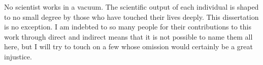 
No scientist works in a vacuum.
The scientific output of each individual is shaped to no small degree by those who have touched their lives deeply.
This dissertation is no exception.
I am indebted to so many people for their contributions to this work through direct and indirect means that it is not possible to name them all here, but I will try to touch on a few whose omission would certainly be a great injustice.


